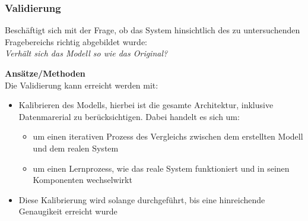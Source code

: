 \subsubsection{Validierung}
Beschäftigt sich mit der Frage, ob das System hinsichtlich des zu untersuchenden Fragebereichs
richtig abgebildet wurde: \\

\textit{Verhält sich das Modell so wie das Original?}
\newline

\textbf{Ansätze/Methoden} \\
\newline
Die Validierung kann erreicht werden mit:
\begin{itemize}
    \item Kalibrieren des Modells, hierbei ist die gesamte Architektur, inklusive Datenmarerial zu berücksichtigen. Dabei handelt es sich um:
    \begin{itemize}
        \item um einen iterativen Prozess des Vergleichs zwischen dem erstellten Modell und dem realen System
        \item um einen Lernprozess, wie das reale System funktioniert und in seinen Komponenten wechselwirkt 
    \end{itemize}
    \item Diese Kalibrierung wird solange durchgeführt, bis eine hinreichende Genaugikeit erreicht wurde
\end{itemize}

